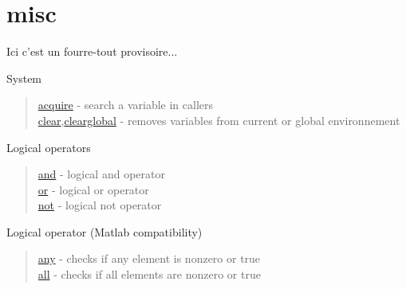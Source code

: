 \chapter*{misc}

Ici c'est un fourre-tout provisoire... 

System

\begin{quote}
\noindent
\hyperlink{acquire}{acquire} - search a variable in callers  \\
\hyperlink{clear}{clear},\hyperlink{clearglobal}{clearglobal} - removes variables from current or global environnement  \\
\end{quote}

Logical operators
\begin{quote}
\noindent
\hyperlink{and}{and} - logical and operator \\
\hyperlink{or}{or} - logical or operator \\
\hyperlink{not}{not} - logical not operator \\
\end{quote}

Logical operator (Matlab compatibility)

\begin{quote}
\noindent
\hyperlink{any}{any} - checks if any element is nonzero or true  \\
\hyperlink{all}{all} - checks if all elements are nonzero or true \\
\end{quote}

